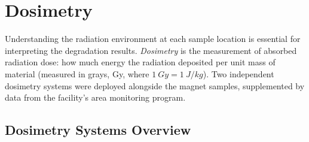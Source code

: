 \documentclass[11pt,letterpaper]{article}
\begin{document}
\section{Dosimetry}
\label{sec:dosimetry}

Understanding the radiation environment at each sample location is essential
for interpreting the degradation results. \emph{Dosimetry} is the measurement
of absorbed radiation dose: how much energy the radiation deposited per unit
mass of material (measured in grays, Gy, where $\SI{1}{Gy} = \SI{1}{J/kg}$).
Two independent dosimetry systems were deployed alongside the magnet samples,
supplemented by data from the facility's area monitoring program.

\subsection{Dosimetry Systems Overview}
\end{document}

